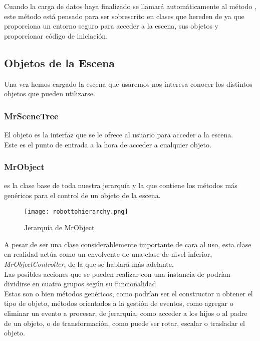 Cuando la carga de datos haya finalizado se llamará automáticamente al método , este método está pensado para ser sobrescrito en clases que hereden de \rorefrobottoengine ya que proporciona un entorno seguro para acceder a la escena, sus objetos y proporcionar código de iniciación.\\

\subsection{Objetos de la Escena}
Una vez hemos cargado la escena que usaremos nos interesa conocer los distintos objetos que pueden utilizarse.\\

\subsubsection{MrSceneTree}\label{susec:MrSceneTree}
El objeto \rorefscenetree es la interfaz que se le ofrece al usuario para acceder a la escena.\\
Este es el punto de entrada a la hora de acceder a cualquier objeto.


\subsubsection{MrObject}
\rorefobject\label{ro:object} es la clase base de toda nuestra jerarquía y la que contiene los métodos más genéricos para el control de un objeto de la escena.\\
\begin{figure}[h!]
\begin{center}
\texttt{[image: robottohierarchy.png]}
\end{center}
\caption[Jerarquía de MrObject]{Jerarquía de MrObject}
\label{fig:robottohierarchy}
\end{figure}
A pesar de ser una clase considerablemente importante de cara al uso, esta clase en realidad actúa como un envolvente de una clase de nivel inferior, \textit{MrObjectController}, de la que se hablará más adelante.\\

Las posibles acciones que se pueden realizar con una instancia de \rorefobject podrían dividirse en cuatro grupos según su funcionalidad.\\
Estas son o bien métodos genéricos, como podrían ser el constructor u obtener el tipo de objeto, métodos orientados a la gestión de eventos, como agregar o eliminar un evento a procesar, de jerarquía, como acceder a los hijos o al padre de un objeto, o de transformación, como puede ser rotar, escalar o trasladar el objeto.\\

